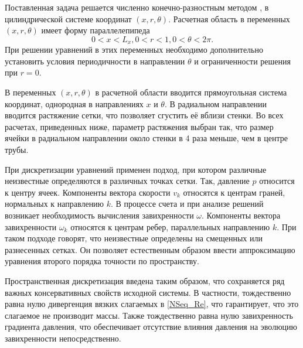 Поставленная задача решается численно конечно-разностным методом \cite{Nikitin2006}, в цилиндрической системе координат $(x,r,\theta)$. Расчетная область в переменных $(x,r,\theta)$ имеет форму параллелепипеда
\begin{equation}
0 < x < L_x, 0 < r < 1, 0 < \theta < 2\pi.
\end{equation}
При решении уравнений в этих переменных необходимо дополнительно установить условия периодичности в направлении $\theta$ и ограниченности решения при $r=0$.

В переменных $(x,r,\theta)$ в расчетной области вводится прямоугольная система координат, однородная в направлениях $x$ и $\theta$. В радиальном направлении вводится растяжение сетки, что позволяет сгустить её вблизи стенки. Во всех расчетах, приведенных ниже, параметр растяжения выбран так, что размер ячейки в радиальном направлении около стенки в 4 раза меньше, чем в центре трубы. 

При дискретизации уравнений применен подход, при котором различные неизвестные определяются в различных точках сетки. Так, давление $p$ относится к центру ячеек. Компоненты вектора скорости $v_k$ относятся к центрам граней, нормальных к направлению $k$. В процессе счета и при анализе решений возникает необходимость вычисления завихренности $\omega$. Компоненты вектора завихренности $\omega_k$ относятся к центрам ребер, параллельных направлению $k$. При таком подходе говорят, что неизвестные определены на смещенных или разнесенных сетках. Он позволяет естественным образом ввести аппроксимацию уравнения второго порядка точности по пространству. 

Пространственная дискретизация введена таким образом, что сохраняется ряд важных консервативных свойств исходной системы. В частности, тождественно равна нулю дивергенция вязких слагаемых в \eqref{NSeq_Re}, что гарантирует, что это слагаемое не производит массы. Также тождественно равна нулю завихренность градиента давления, что обеспечивает отсутствие влияния давления на эволюцию завихренности непосредственно. 

